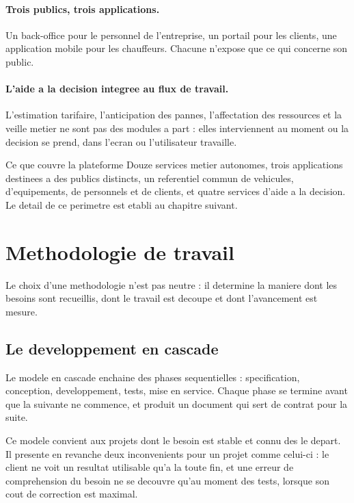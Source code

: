 \paragraph{Trois publics, trois applications.}
Un back-office pour le personnel de l'entreprise, un portail pour les
clients, une application mobile pour les chauffeurs. Chacune n'expose que
ce qui concerne son public.

\paragraph{L'aide a la decision integree au flux de travail.}
L'estimation tarifaire, l'anticipation des pannes, l'affectation des
ressources et la veille metier ne sont pas des modules a part : elles
interviennent au moment ou la decision se prend, dans l'ecran ou
l'utilisateur travaille.

\begin{definitionbox}{Ce que couvre la plateforme}
Douze services metier autonomes, trois applications destinees a des
publics distincts, un referentiel commun de vehicules, d'equipements,
de personnels et de clients, et quatre services d'aide a la decision.
Le detail de ce perimetre est etabli au chapitre suivant.
\end{definitionbox}

\section{Methodologie de travail}
\label{sec:methodologie}

Le choix d'une methodologie n'est pas neutre : il determine la maniere
dont les besoins sont recueillis, dont le travail est decoupe et dont
l'avancement est mesure.

\subsection{Le developpement en cascade}

Le modele en cascade enchaine des phases sequentielles : specification,
conception, developpement, tests, mise en service. Chaque phase se
termine avant que la suivante ne commence, et produit un document qui
sert de contrat pour la suite.

Ce modele convient aux projets dont le besoin est stable et connu des le
depart. Il presente en revanche deux inconvenients pour un projet comme
celui-ci : le client ne voit un resultat utilisable qu'a la toute fin, et
une erreur de comprehension du besoin ne se decouvre qu'au moment des
tests, lorsque son cout de correction est maximal.

